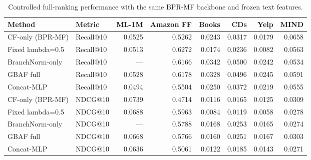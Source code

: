 \begin{table}[t]
\centering
\caption{Controlled full-ranking performance with the same BPR-MF backbone and frozen text features.}
\begin{tabular}{llrrrrrr}
\toprule
Method & Metric & ML-1M & Amazon FF & Books & CDs & Yelp & MIND \\
\midrule
CF-only (BPR-MF) & Recall@10 & 0.0525 & 0.5262 & 0.0243 & 0.0317 & 0.0179 & 0.0658 \\
Fixed lambda=0.5 & Recall@10 & 0.0513 & 0.6272 & 0.0174 & 0.0236 & 0.0082 & 0.0563 \\
BranchNorm-only & Recall@10 & --- & 0.6166 & 0.0342 & 0.0500 & 0.0242 & 0.0534 \\
GBAF full & Recall@10 & 0.0528 & 0.6178 & 0.0328 & 0.0496 & 0.0245 & 0.0591 \\
Concat-MLP & Recall@10 & 0.0494 & 0.5504 & 0.0250 & 0.0372 & 0.0219 & 0.0555 \\
\midrule
CF-only (BPR-MF) & NDCG@10 & 0.0739 & 0.4714 & 0.0116 & 0.0165 & 0.0125 & 0.0309 \\
Fixed lambda=0.5 & NDCG@10 & 0.0688 & 0.5963 & 0.0084 & 0.0119 & 0.0058 & 0.0278 \\
BranchNorm-only & NDCG@10 & --- & 0.5788 & 0.0168 & 0.0253 & 0.0165 & 0.0274 \\
GBAF full & NDCG@10 & 0.0668 & 0.5766 & 0.0160 & 0.0251 & 0.0167 & 0.0303 \\
Concat-MLP & NDCG@10 & 0.0636 & 0.5061 & 0.0122 & 0.0185 & 0.0143 & 0.0271 \\
\bottomrule
\end{tabular}
\end{table}
